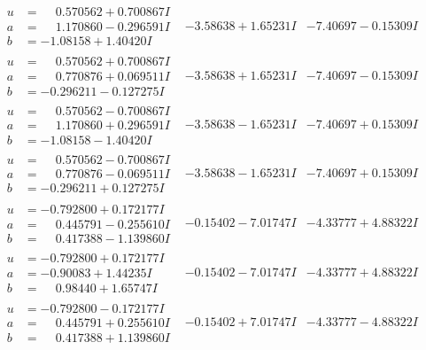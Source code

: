 \documentclass[1p]{elsarticle_modified}
\theoremstyle{definition}
\begin{document}
$$\begin{array}{c|c|c}
\begin{aligned}
u &= \phantom{-}0.570562 + 0.700867 I \\
a &= \phantom{-}1.170860 - 0.296591 I \\
b &= -1.08158 + 1.40420 I\end{aligned}
 & -3.58638 + 1.65231 I & -7.40697 - 0.15309 I \\ \hline\begin{aligned}
u &= \phantom{-}0.570562 + 0.700867 I \\
a &= \phantom{-}0.770876 + 0.069511 I \\
b &= -0.296211 - 0.127275 I\end{aligned}
 & -3.58638 + 1.65231 I & -7.40697 - 0.15309 I \\ \hline\begin{aligned}
u &= \phantom{-}0.570562 - 0.700867 I \\
a &= \phantom{-}1.170860 + 0.296591 I \\
b &= -1.08158 - 1.40420 I\end{aligned}
 & -3.58638 - 1.65231 I & -7.40697 + 0.15309 I \\ \hline\begin{aligned}
u &= \phantom{-}0.570562 - 0.700867 I \\
a &= \phantom{-}0.770876 - 0.069511 I \\
b &= -0.296211 + 0.127275 I\end{aligned}
 & -3.58638 - 1.65231 I & -7.40697 + 0.15309 I \\ \hline\begin{aligned}
u &= -0.792800 + 0.172177 I \\
a &= \phantom{-}0.445791 - 0.255610 I \\
b &= \phantom{-}0.417388 - 1.139860 I\end{aligned}
 & -0.15402 - 7.01747 I & -4.33777 + 4.88322 I \\ \hline\begin{aligned}
u &= -0.792800 + 0.172177 I \\
a &= -0.90083 + 1.44235 I \\
b &= \phantom{-}0.98440 + 1.65747 I\end{aligned}
 & -0.15402 - 7.01747 I & -4.33777 + 4.88322 I \\ \hline\begin{aligned}
u &= -0.792800 - 0.172177 I \\
a &= \phantom{-}0.445791 + 0.255610 I \\
b &= \phantom{-}0.417388 + 1.139860 I\end{aligned}
 & -0.15402 + 7.01747 I & -4.33777 - 4.88322 I \\ \hline\begin{aligned}

\end{aligned}
\end{array}$$
\end{document}
